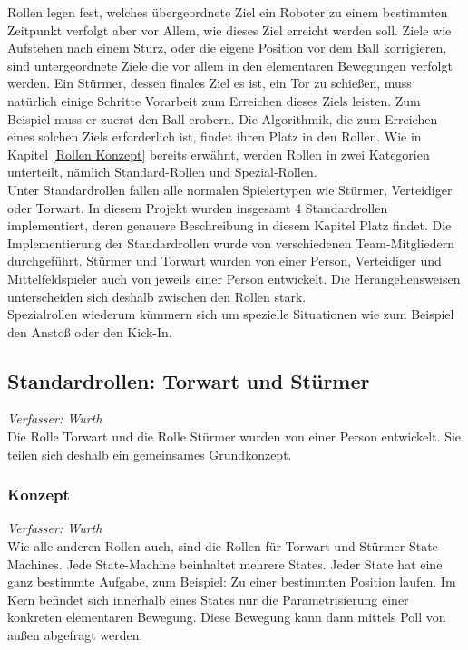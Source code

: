 \documentclass[fontsize=12pt,a4paper,final]{scrartcl}[2003/01/01]
\begin{document}
Rollen legen fest, welches übergeordnete Ziel ein Roboter zu einem bestimmten Zeitpunkt verfolgt aber vor Allem, wie dieses Ziel erreicht werden soll. Ziele wie Aufstehen nach einem Sturz, oder die eigene Position vor dem Ball korrigieren, sind untergeordnete Ziele die vor allem in den elementaren Bewegungen verfolgt werden. Ein Stürmer, dessen finales Ziel es ist, ein Tor zu schießen, muss natürlich einige Schritte Vorarbeit zum Erreichen dieses Ziels leisten. Zum Beispiel muss er zuerst den Ball erobern. Die Algorithmik, die zum Erreichen eines solchen Ziels erforderlich ist, findet ihren Platz in den Rollen. Wie in Kapitel \ref{Rollen Konzept} bereits erwähnt, werden Rollen in zwei Kategorien unterteilt, nämlich Standard-Rollen und Spezial-Rollen.
\\

Unter Standardrollen fallen alle normalen Spielertypen wie Stürmer, Verteidiger oder Torwart. In diesem Projekt wurden insgesamt 4 Standardrollen implementiert, deren genauere Beschreibung in diesem Kapitel Platz findet. Die Implementierung der Standardrollen wurde von verschiedenen Team-Mitgliedern durchgeführt. Stürmer und Torwart wurden von einer Person, Verteidiger und Mittelfeldspieler auch von jeweils einer Person entwickelt. Die Herangehensweisen unterscheiden sich deshalb zwischen den Rollen stark.
\\

Spezialrollen wiederum kümmern sich um spezielle Situationen wie zum Beispiel den Anstoß oder den Kick-In.


\subsection{Standardrollen: Torwart und Stürmer}
\textit{Verfasser: Wurth}\\

Die Rolle Torwart und die Rolle Stürmer wurden von einer Person entwickelt. Sie teilen sich deshalb ein gemeinsames Grundkonzept.

\subsubsection{Konzept}
\textit{Verfasser: Wurth}\\

Wie alle anderen Rollen auch, sind die Rollen für Torwart und Stürmer State-Machines. Jede State-Machine beinhaltet mehrere States. Jeder State hat eine ganz bestimmte Aufgabe, zum Beispiel: Zu einer bestimmten Position laufen. Im Kern befindet sich innerhalb eines States nur die Parametrisierung einer konkreten elementaren Bewegung. Diese Bewegung kann dann mittels Poll von außen abgefragt werden.
\\
\end{document}
